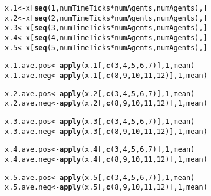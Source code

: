 \documentclass{article}\usepackage[]{graphicx}\usepackage[]{color}
\makeatletter
\newcommand{\hlnum}[1]{\textcolor[rgb]{0.686,0.059,0.569}{#1}}%
\newcommand{\hlopt}[1]{\textcolor[rgb]{0,0,0}{#1}}%
\newcommand{\hlstd}[1]{\textcolor[rgb]{0.345,0.345,0.345}{#1}}%
\newcommand{\hlkwb}[1]{\textcolor[rgb]{0.69,0.353,0.396}{#1}}%
\newcommand{\hlkwd}[1]{\textcolor[rgb]{0.737,0.353,0.396}{\textbf{#1}}}%
\newenvironment{kframe}{%
 \def\at@end@of@kframe{}%
 \ifinner\ifhmode%
  \def\at@end@of@kframe{\end{minipage}}%
  \begin{minipage}{\columnwidth}%
 \fi\fi%
 \def\FrameCommand##1{\hskip\@totalleftmargin \hskip-\fboxsep
 \colorbox{shadecolor}{##1}\hskip-\fboxsep
     \hskip-\linewidth \hskip-\@totalleftmargin \hskip\columnwidth}%
 \MakeFramed {\advance\hsize-\width
   \@totalleftmargin\z@ \linewidth\hsize
   \@setminipage}}%
 {\par\unskip\endMakeFramed%
 \at@end@of@kframe}
\newenvironment{knitrout}{}{} %
\makeatother
\begin{document}
\begin{knitrout}
\begin{kframe}
\begin{alltt}
    \hlstd{x.1} \hlkwb{<-} \hlstd{x[}\hlkwd{seq}\hlstd{(}\hlnum{1}\hlstd{, numTimeTicks} \hlopt{*} \hlstd{numAgents, numAgents), ]}
    \hlstd{x.2} \hlkwb{<-} \hlstd{x[}\hlkwd{seq}\hlstd{(}\hlnum{2}\hlstd{, numTimeTicks} \hlopt{*} \hlstd{numAgents, numAgents), ]}
    \hlstd{x.3} \hlkwb{<-} \hlstd{x[}\hlkwd{seq}\hlstd{(}\hlnum{3}\hlstd{, numTimeTicks} \hlopt{*} \hlstd{numAgents, numAgents), ]}
    \hlstd{x.4} \hlkwb{<-} \hlstd{x[}\hlkwd{seq}\hlstd{(}\hlnum{4}\hlstd{, numTimeTicks} \hlopt{*} \hlstd{numAgents, numAgents), ]}
    \hlstd{x.5} \hlkwb{<-} \hlstd{x[}\hlkwd{seq}\hlstd{(}\hlnum{5}\hlstd{, numTimeTicks} \hlopt{*} \hlstd{numAgents, numAgents), ]}

    \hlstd{x.1.ave.pos} \hlkwb{<-} \hlkwd{apply}\hlstd{(x.1[,} \hlkwd{c}\hlstd{(}\hlnum{3}\hlstd{,} \hlnum{4}\hlstd{,} \hlnum{5}\hlstd{,} \hlnum{6}\hlstd{,} \hlnum{7}\hlstd{)],} \hlnum{1}\hlstd{, mean)}
    \hlstd{x.1.ave.neg} \hlkwb{<-} \hlkwd{apply}\hlstd{(x.1[,} \hlkwd{c}\hlstd{(}\hlnum{8}\hlstd{,} \hlnum{9}\hlstd{,} \hlnum{10}\hlstd{,} \hlnum{11}\hlstd{,} \hlnum{12}\hlstd{)],} \hlnum{1}\hlstd{, mean)}

    \hlstd{x.2.ave.pos} \hlkwb{<-} \hlkwd{apply}\hlstd{(x.2[,} \hlkwd{c}\hlstd{(}\hlnum{3}\hlstd{,} \hlnum{4}\hlstd{,} \hlnum{5}\hlstd{,} \hlnum{6}\hlstd{,} \hlnum{7}\hlstd{)],} \hlnum{1}\hlstd{, mean)}
    \hlstd{x.2.ave.neg} \hlkwb{<-} \hlkwd{apply}\hlstd{(x.2[,} \hlkwd{c}\hlstd{(}\hlnum{8}\hlstd{,} \hlnum{9}\hlstd{,} \hlnum{10}\hlstd{,} \hlnum{11}\hlstd{,} \hlnum{12}\hlstd{)],} \hlnum{1}\hlstd{, mean)}

    \hlstd{x.3.ave.pos} \hlkwb{<-} \hlkwd{apply}\hlstd{(x.3[,} \hlkwd{c}\hlstd{(}\hlnum{3}\hlstd{,} \hlnum{4}\hlstd{,} \hlnum{5}\hlstd{,} \hlnum{6}\hlstd{,} \hlnum{7}\hlstd{)],} \hlnum{1}\hlstd{, mean)}
    \hlstd{x.3.ave.neg} \hlkwb{<-} \hlkwd{apply}\hlstd{(x.3[,} \hlkwd{c}\hlstd{(}\hlnum{8}\hlstd{,} \hlnum{9}\hlstd{,} \hlnum{10}\hlstd{,} \hlnum{11}\hlstd{,} \hlnum{12}\hlstd{)],} \hlnum{1}\hlstd{, mean)}

    \hlstd{x.4.ave.pos} \hlkwb{<-} \hlkwd{apply}\hlstd{(x.4[,} \hlkwd{c}\hlstd{(}\hlnum{3}\hlstd{,} \hlnum{4}\hlstd{,} \hlnum{5}\hlstd{,} \hlnum{6}\hlstd{,} \hlnum{7}\hlstd{)],} \hlnum{1}\hlstd{, mean)}
    \hlstd{x.4.ave.neg} \hlkwb{<-} \hlkwd{apply}\hlstd{(x.4[,} \hlkwd{c}\hlstd{(}\hlnum{8}\hlstd{,} \hlnum{9}\hlstd{,} \hlnum{10}\hlstd{,} \hlnum{11}\hlstd{,} \hlnum{12}\hlstd{)],} \hlnum{1}\hlstd{, mean)}

    \hlstd{x.5.ave.pos} \hlkwb{<-} \hlkwd{apply}\hlstd{(x.5[,} \hlkwd{c}\hlstd{(}\hlnum{3}\hlstd{,} \hlnum{4}\hlstd{,} \hlnum{5}\hlstd{,} \hlnum{6}\hlstd{,} \hlnum{7}\hlstd{)],} \hlnum{1}\hlstd{, mean)}
    \hlstd{x.5.ave.neg} \hlkwb{<-} \hlkwd{apply}\hlstd{(x.5[,} \hlkwd{c}\hlstd{(}\hlnum{8}\hlstd{,} \hlnum{9}\hlstd{,} \hlnum{10}\hlstd{,} \hlnum{11}\hlstd{,} \hlnum{12}\hlstd{)],} \hlnum{1}\hlstd{, mean)}


\end{alltt}
\end{kframe}
\end{knitrout}
\end{document}

